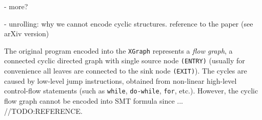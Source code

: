 - more?

- unrolling: why we cannot encode cyclic structures. reference to the paper (see arXiv version)

The original program encoded into the \texttt{XGraph} represents a \textit{flow graph}, a connected cyclic directed graph with single source node \texttt{(ENTRY)} (usually for convenience all leaves are connected to the sink node \texttt{(EXIT)}). The cycles are caused by low-level jump instructions, obtained from non-linear high-level control-flow statements (such as \texttt{while}, \texttt{do-while}, \texttt{for}, etc.). However, the cyclic flow graph cannot be encoded into SMT formula since ...
//TODO:REFERENCE.%



